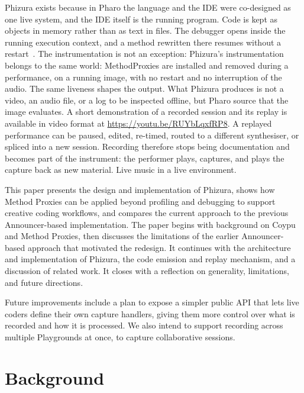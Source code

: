 \documentclass[
]{ceurart}
\begin{document}
Phizura exists because in Pharo the language and the IDE were co-designed as one live system, and the IDE itself is the running program.
Code is kept as objects in memory rather than as text in files.
The debugger opens inside the running execution context, and a method rewritten there resumes without a restart~\cite{Grig26a}.
The instrumentation is not an exception: Phizura's instrumentation belongs to the same world: MethodProxies are installed and removed during a performance, on a running image, with no restart and no interruption of the audio.
The same liveness shapes the output.
What Phizura produces is not a video, an audio file, or a log to be inspected offline, but Pharo source that the image evaluates.
A short demonstration of a recorded session and its replay is available in video format at \url{https://youtu.be/RUYbLqxfRP8}.
A replayed performance can be paused, edited, re-timed, routed to a different synthesiser, or spliced into a new session.
Recording therefore stops being documentation and becomes part of the instrument: the performer plays, captures, and plays the capture back as new material.
Live music in a live environment.

This paper presents the design and implementation of Phizura, shows how Method Proxies\cite{Jord24b} can be applied beyond profiling and debugging to support creative coding workflows, and compares the current approach to the previous Announcer-based implementation. The paper begins with background on Coypu and Method Proxies, then discusses the limitations of the earlier Announcer-based approach that motivated the redesign. It continues with the architecture and implementation of Phizura, the code emission and replay mechanism, and a discussion of related work. It closes with a reflection on generality, limitations, and future directions.

Future improvements include a plan to expose a simpler public API that lets live coders define their own capture handlers, giving them more control over what is recorded and how it is processed. We also intend to support recording across multiple Playgrounds at once, to capture collaborative sessions.

\section{Background}\label{sec:bac}
\end{document}
